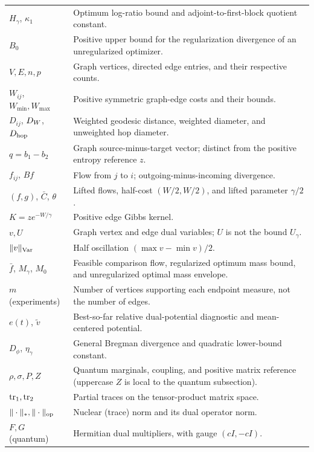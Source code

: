 \begin{longtable}{@{}p{}p{}@{}}
$H_\gamma$, $\kappa_1$ & Optimum log-ratio bound and adjoint-to-first-block quotient constant.\\
$B_0$ & Positive upper bound for the regularization divergence of an unregularized optimizer.\\
$V,E,n,p$ & Graph vertices, directed edge entries, and their respective counts.\\
$W_{ij}$, $W_{\min},W_{\max}$ & Positive symmetric graph-edge costs and their bounds.\\
$D_{ij}$, $D_W$, $D_{\mathrm{hop}}$ & Weighted geodesic distance, weighted diameter, and unweighted hop diameter.\\
$q=b_1-b_2$ & Graph source-minus-target vector; distinct from the positive entropy reference $z$.\\
$f_{ij}$, $Bf$ & Flow from $j$ to $i$; outgoing-minus-incoming divergence.\\
$(f,g)$, $\bar C$, $\theta$ & Lifted flows, half-cost $(W/2,W/2)$, and lifted parameter $\gamma/2$.\\
$K=z e^{-W/\gamma}$ & Positive edge Gibbs kernel.\\
$v,U$ & Graph vertex and edge dual variables; $U$ is not the bound $U_\gamma$.\\
$\|v\|_{\rm Var}$ & Half oscillation $(\max v-\min v)/2$.\\
$\bar f$, $M_\gamma$, $M_0$ & Feasible comparison flow, regularized optimum mass bound, and unregularized optimal mass envelope.\\
$m$ (experiments) & Number of vertices supporting each endpoint measure, not the number of edges.\\
$e(t)$, $\widetilde v$ & Best-so-far relative dual-potential diagnostic and mean-centered potential.\\
$D_\phi$, $\eta_\gamma$ & General Bregman divergence and quadratic lower-bound constant.\\
$\rho,\sigma,P,Z$ & Quantum marginals, coupling, and positive matrix reference (uppercase $Z$ is local to the quantum subsection).\\
$\operatorname{tr}_1,\operatorname{tr}_2$ & Partial traces on the tensor-product matrix space.\\
$\|\cdot\|_*,\|\cdot\|_{\rm op}$ & Nuclear (trace) norm and its dual operator norm.\\
$F,G$ (quantum) & Hermitian dual multipliers, with gauge $(cI,-cI)$.\\
\bottomrule
\end{longtable}
\endgroup
